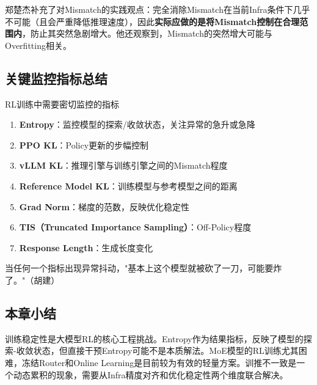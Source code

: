 郑楚杰补充了对Mismatch的实践观点：完全消除Mismatch在当前Infra条件下几乎不可能（且会严重降低推理速度），因此\textbf{实际应做的是将Mismatch控制在合理范围内}，防止其突然急剧增大。他还观察到，Mismatch的突然增大可能与Overfitting相关。

\subsection{关键监控指标总结}

\begin{importantbox}{RL训练中需要密切监控的指标}
\begin{enumerate}
    \item \textbf{Entropy}：监控模型的探索/收敛状态，关注异常的急升或急降
    \item \textbf{PPO KL}：Policy更新的步幅控制
    \item \textbf{vLLM KL}：推理引擎与训练引擎之间的Mismatch程度
    \item \textbf{Reference Model KL}：训练模型与参考模型之间的距离
    \item \textbf{Grad Norm}：梯度的范数，反映优化稳定性
    \item \textbf{TIS（Truncated Importance Sampling）}：Off-Policy程度
    \item \textbf{Response Length}：生成长度变化
\end{enumerate}
当任何一个指标出现异常抖动，"基本上这个模型就被砍了一刀，可能要炸了。"（胡建）
\end{importantbox}

\subsection{本章小结}

训练稳定性是大模型RL的核心工程挑战。Entropy作为结果指标，反映了模型的探索-收敛状态，但直接干预Entropy可能不是本质解法。MoE模型的RL训练尤其困难，冻结Router和Online Learning是目前较为有效的轻量方案。训推不一致是一个动态累积的现象，需要从Infra精度对齐和优化稳定性两个维度联合解决。


